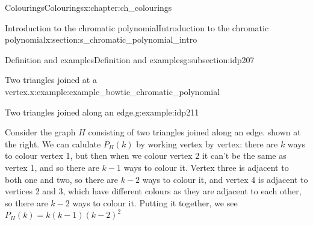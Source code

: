 \documentclass[oneside,10pt,]{book}
\numberwithin{equation}{section}
\begin{document}
\begin{chapterptx}{Colourings}{}{Colourings}{}{}{x:chapter:ch_colourings}
\begin{sectionptx}{Introduction to the chromatic polynomial}{}{Introduction to the chromatic polynomial}{}{}{x:section:s_chromatic_polynomial_intro}
\begin{subsectionptx}{Definition and examples}{}{Definition and examples}{}{}{g:subsection:idp207}
\begin{example}{Two triangles joined at a vertex.}{x:example:example_bowtie_chromatic_polynomial}
\begin{sidebyside}{2}{0.025}{0.025}{0.05}
\begin{sbspanel}{0.3}
{\begin{tikzpicture}[scale=2]
\end{tikzpicture}
}%
\end{sbspanel}%
\end{sidebyside}%
\end{example}
\begin{example}{Two triangles joined along an edge.}{g:example:idp211}%
\begin{sidebyside}{2}{0.025}{0.025}{0.05}%
\begin{sbspanel}{0.6}%
Consider the graph \(H\) consisting of two triangles joined along an edge. shown at the right.  We can calulate \(P_H(k)\) by working vertex by vertex: there are \(k\) ways to colour vertex 1, but then when we colour vertex 2 it can't be the same as vertex 1, and so there are \(k-1\) ways to colour it.  Vertex three is adjacent to both one and two, so there are \(k-2\) ways to colour it, and vertex 4 is adjacent to vertices 2 and 3, which have different colours as they are adjacent to each other, so there are \(k-2\) ways to colour it.  Putting it together, we see \(P_H(k)=k(k-1)(k-2)^2\)%
\end{sbspanel}%
\begin{sbspanel}{0.3}%
\end{sbspanel}
\end{sidebyside}
\end{example}
\end{subsectionptx}
\end{sectionptx}
\end{chapterptx}
\end{document}
